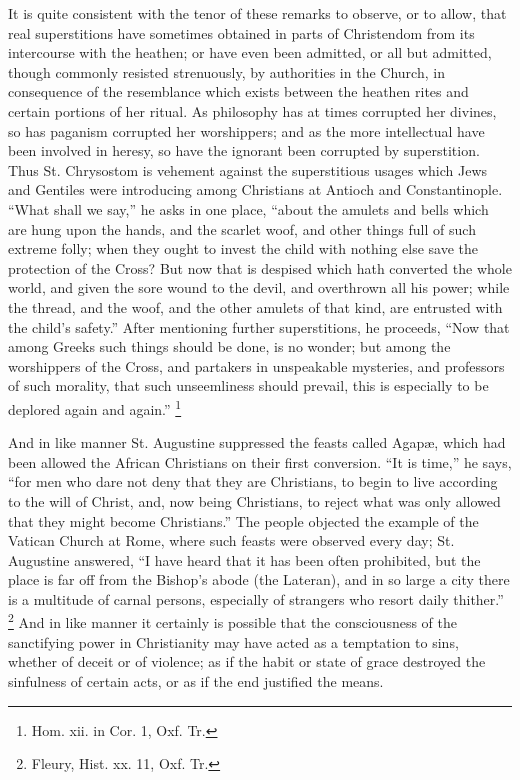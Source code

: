 It is quite consistent with the tenor of these remarks
to observe, or to allow, that real superstitions have
sometimes obtained in parts of Christendom from its
intercourse with the heathen; or have even been admitted,
or all but admitted, though commonly resisted
strenuously, by authorities in the Church, in consequence
of the resemblance which exists between the heathen rites
and certain portions of her ritual. As philosophy has at
times corrupted her divines, so has paganism
corrupted her worshippers; and as the more intellectual
have been involved in heresy, so have the ignorant been
corrupted by superstition. Thus St. Chrysostom is
vehement against the superstitious usages which Jews and
Gentiles were introducing among Christians at Antioch and
Constantinople. ``What shall we say,'' he asks in
one place, ``about the amulets and bells which are
hung upon the hands, and the scarlet woof, and other
things full of such extreme folly; when they ought to
invest the child with nothing else save the protection of
the Cross? But now that is despised which hath converted
the whole world, and given the sore wound to the devil,
and overthrown all his power; while the thread, and the
woof, and the other amulets of that kind, are entrusted
with the child's safety.'' After mentioning further
superstitions, he proceeds, ``Now that among Greeks
such things should be done, is no wonder; but among the
worshippers of the Cross, and partakers in unspeakable
mysteries, and professors of such morality, that such
unseemliness should prevail, this is especially to be
deplored again and again.'' \footnote{Hom. xii. in Cor. 1, Oxf. Tr.}

And in like manner St. Augustine suppressed the feasts
called Agapæ, which had been allowed the African
Christians on their first conversion. ``It is
time,'' he says, ``for men who dare not deny that
they are Christians, to begin to live according to the
will of Christ, and, now being Christians, to reject what
was only allowed that they might become Christians.''
The people objected the example of the Vatican Church at
Rome, where such feasts were observed every day; St.
Augustine answered, ``I have heard that it has been
often prohibited, but the place is far off from the
Bishop's abode (the Lateran), and in so large a city
there is a multitude of carnal persons, especially of
strangers who resort daily thither.'' \footnote{Fleury, Hist. xx. 11, Oxf.
Tr.} And in
like manner it certainly is possible that the
consciousness of the sanctifying power in Christianity
may have acted as a temptation to sins, whether of deceit
or of violence; as if the habit or state of grace
destroyed the sinfulness of certain acts, or as if the
end justified the means.

